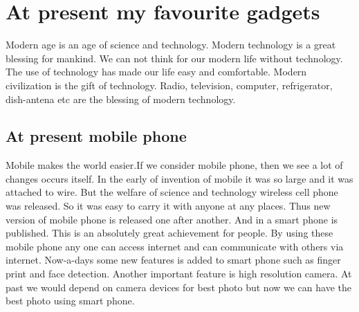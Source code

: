\section{At present my favourite gadgets}
Modern age is an age of science and technology. Modern technology is a great blessing for mankind. We can not think for our modern life without technology. The use of technology has made our life easy and comfortable.  Modern civilization is the gift of technology. Radio, television, computer, refrigerator, dish-antena etc are the blessing of modern technology.\\
\subsection{At present mobile phone} Mobile makes the world easier.If we consider mobile phone, then we see a lot of changes occurs itself. In the early of invention of mobile it was so large and it was attached to wire. But the welfare of science and technology wireless cell phone was released. So it was easy to carry it with anyone at any places. Thus new version of mobile phone is released one after another. And in a smart phone is published. This is an absolutely great achievement for people. By using these mobile phone any one can access internet and can communicate with others via internet. Now-a-days some new features is added to smart phone such as finger print and face detection. Another important feature is high resolution camera. At past we would depend on camera devices for best photo but now we can have the best photo using smart phone.
